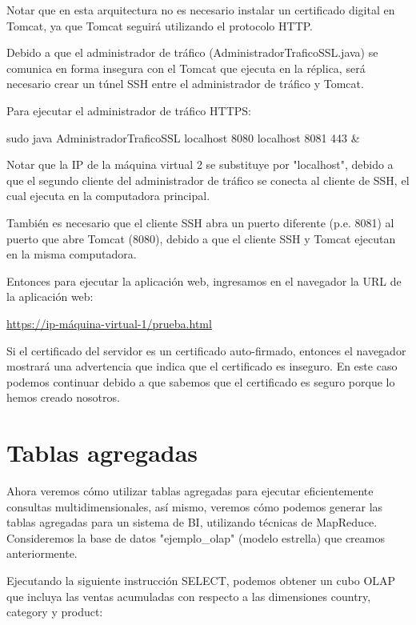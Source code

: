 Notar que en esta arquitectura no es necesario instalar un certificado digital en Tomcat, ya que Tomcat seguirá utilizando el protocolo HTTP.

Debido a que el administrador de tráfico (AdministradorTraficoSSL.java) se comunica en forma insegura con el Tomcat que ejecuta en la réplica, será necesario crear un túnel SSH entre el administrador de tráfico y Tomcat.

Para ejecutar el administrador de tráfico HTTPS:

\begin{SourceCode}
sudo java AdministradorTraficoSSL localhost 8080 localhost 8081 443 &
\end{SourceCode}

Notar que la IP de la máquina virtual 2 se substituye por "localhost", debido a que el segundo cliente del administrador de tráfico se conecta al cliente de SSH, el cual ejecuta en la computadora principal.

También es necesario que el cliente SSH abra un puerto diferente (p.e. 8081) al puerto que abre Tomcat (8080), debido a que el cliente SSH y Tomcat ejecutan en la misma computadora.

Entonces para ejecutar la aplicación web, ingresamos en el navegador la URL de la aplicación web:

\url{https://ip-máquina-virtual-1/prueba.html}

Si el certificado del servidor es un certificado auto-firmado, entonces el navegador mostrará una advertencia que indica que el certificado es inseguro. En este caso podemos continuar debido a que sabemos que el certificado es seguro porque lo hemos creado nosotros.

\clearpage


\chapter{Tablas agregadas}

Ahora veremos cómo utilizar tablas agregadas para ejecutar eficientemente consultas multidimensionales, así mismo, veremos cómo podemos generar las tablas agregadas para un sistema de BI, utilizando técnicas de MapReduce. Consideremos la base de datos "ejemplo\_olap" (modelo estrella) que creamos anteriormente.

Ejecutando la siguiente instrucción SELECT, podemos obtener un cubo OLAP que incluya las ventas acumuladas con respecto a las dimensiones country, category y product:

